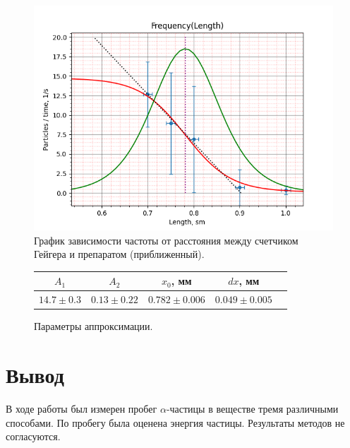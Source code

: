 \documentclass[a4paper,12pt]{article} %
\begin{document}
\begin{figure}[h!]
	\centering
		\includegraphics[width=1\textwidth]{ZoomedGeiger.png}
		\caption{График зависимости частоты от расстояния между счетчиком Гейгера и препаратом (приближенный).}
		\label{graph::geiger}
\end{figure}

\begin{figure}
    \begin{center}
    	\begin{tabular}{|c|c|c|c|c|}
    		\hline
    		$A_1$ & $A_2$ & $x_0$, мм & $dx$, мм \\ \hline
    		$14.7 \pm 0.3$  & $0.13 \pm 0.22$    & $0.782 \pm 0.006$        & $0.049 \pm 0.005$    \\ \hline
    	\end{tabular}
    	\caption{Параметры аппроксимации.}
    	\label{tab:pfrfmetry1}
    \end{center}
\end{figure}

\section{Вывод}

В ходе работы был измерен пробег $\alpha$-частицы в веществе тремя различными способами. По пробегу была оценена энергия частицы. Результаты методов не согласуются.
\end{document}
